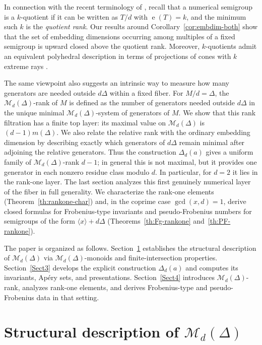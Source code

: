 \documentclass[12pt,a4paper]{amsart}
\theoremstyle{definition}
\theoremstyle{remark}
\begin{document}
In connection with the recent terminology of \cite{australian}, recall that a numerical semigroup is a $k$-quotient if it can be written
as $T/d$ with $\operatorname{e}(T)=k$, and the minimum such $k$ is the \emph{quotient rank}. Our results around Corollary~\ref{cor:embdim-both} show that the set of embedding dimensions occurring among multiples of a fixed semigroup is upward closed above the quotient rank.
Moreover, $k$-quotients admit an equivalent polyhedral description in terms of projections of cones with $k$ extreme rays \cite{cones}.

The same viewpoint also suggests an intrinsic way to measure how many generators are needed outside $d\Delta$ within a fixed fiber. For \(M/d=\Delta\), the \(\mathcal{M}_d(\Delta)\)-rank of \(M\) is defined as the number of generators needed outside \(d\Delta\) in the unique minimal \(\mathcal{M}_d(\Delta)\)-system of generators of \(M\). We show that this rank filtration has a finite top layer: its maximal value on \(\mathcal{M}_d(\Delta)\) is \((d-1)m(\Delta)\). We also relate the relative rank with the ordinary embedding dimension by describing exactly which generators of \(d\Delta\) remain minimal after adjoining the relative generators. Thus the construction \(\Delta_d(a)\) gives a uniform family of \(\mathcal{M}_d(\Delta)\)-rank \(d-1\); in general this is not maximal, but it provides one generator in each nonzero residue class modulo \(d\). In particular, for \(d=2\) it lies in the rank-one layer. The last section analyzes this first genuinely numerical layer of the fiber in full generality. We characterize the rank-one elements (Theorem~\ref{th:rankone-char}) and, in the coprime case $\gcd(x,d)=1$, derive closed formulas for Frobenius-type invariants and pseudo-Frobenius numbers for semigroups of the form $\langle x\rangle+d\Delta$ (Theorems~\ref{th:Fg-rankone} and~\ref{th:PF-rankone}).

The paper is organized as follows. Section~\ref{sect2} establishes the structural description of $\mathcal{M}_d(\Delta)$ via $\mathcal{M}_d(\Delta)$-monoids and finite-intersection properties. Section~\ref{Sect3} develops the explicit construction $\Delta_d(a)$ and computes its invariants, Ap\'ery sets, and presentations. Section~\ref{Sect4} introduces $\mathcal{M}_d(\Delta)$-rank, analyzes rank-one elements, and derives Frobenius-type and pseudo-Frobenius data in that setting.

\section{\texorpdfstring{Structural description of $\mathcal{M}_d(\Delta)$}{Structural description of Md(Delta)}}\label{sect2}
\end{document}
